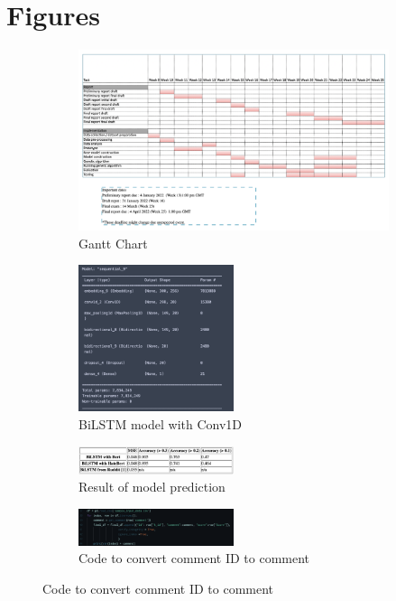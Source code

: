 \documentclass[11pt, natbib=false]{article}
\begin{document}
\section{Figures}
\begin{figure}[h!]
  \centering
  \begin{subfigure}[b]{0.7\linewidth}
    \caption{Gantt Chart}
    \includegraphics[width=\linewidth]{./gantt.png}
  \end{subfigure}

  \begin{subfigure}[b]{1.0\linewidth}
  \centering
  \caption{BiLSTM model with Conv1D}
  \includegraphics[width=0.5\textwidth]{./model.png}
  \end{subfigure}

  \begin{subfigure}[b]{1.0\linewidth}
  \centering
  \caption{Result of model prediction}
  \includegraphics[width=0.5\textwidth]{./table1.png}
  \end{subfigure}

  \begin{subfigure}[b]{1.0\linewidth}
  \centering
  \caption{Code to convert comment ID to comment}
  \includegraphics[width=0.5\textwidth]{./code.png}
  \end{subfigure}

\end{figure}
\end{document}
